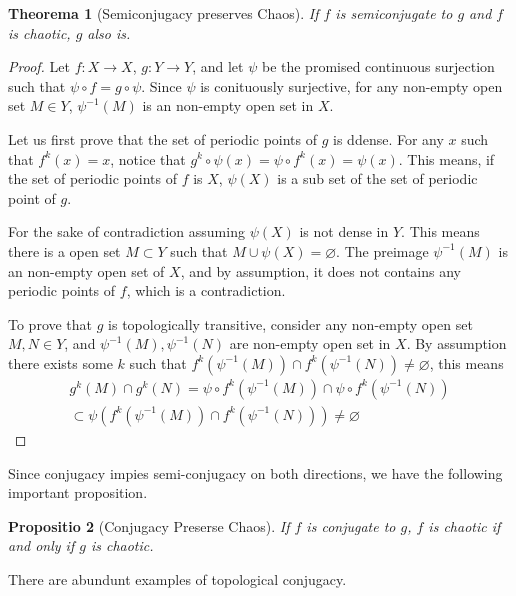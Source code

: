\documentclass{report}
\newtheorem{thm}{Theorema}[chapter]
\newtheorem{prop}[thm]{Propositio}
\theoremstyle{definition}
\theoremstyle{definition}
\theoremstyle{remark}
\renewcommand\emptyset{\varnothing}
\begin{document}
\begin{thm}[Semiconjugacy preserves Chaos]\label{th_semicong_chaos}
	If $f$ is semiconjugate to $g$ and $f$ is chaotic, $g$ also is.
\end{thm}

\begin{proof}
	Let $f: X \rightarrow X$, $g:  Y \rightarrow Y$, and let $\psi$ be the promised continuous surjection such that
	$\psi \circ f = g \circ \psi$. 
	Since $\psi$ is conituously surjective, for any non-empty open set $M \in Y$, $\psi^{-1}(M)$ is an non-empty open set in $X$.

	Let us first prove that the set of periodic points of $g$ is ddense.
	For any $x$ such that $f^k(x) = x$, notice that $g^k \circ \psi (x) = \psi \circ f^k (x) = \psi(x)$. 
	This means, if the set of periodic points of $f$ is $X$, $\psi(X)$ is a sub set of the set of periodic point of $g$.

	For the sake of contradiction assuming $\psi(X)$ is not dense in $Y$. 
	This means there is a open set $M \subset Y$ such that $M \cup \psi(X) = \emptyset$.
	The preimage $\psi^{-1}(M)$ is an non-empty open set of $X$, and by assumption, it does not contains any periodic points of $f$, which is a contradiction.

	To prove that $g$ is topologically transitive, consider any non-empty open set $M, N \in Y$, and $\psi^{-1}(M), \psi^{-1}(N)$ are non-empty open set in $X$. 
	By assumption there exists some $k$ such that $f^k(\psi^{-1}(M)) \cap f^k(\psi^{-1}(N)) \neq \emptyset$, this means 
	\begin{align*}
		g^k(M) \cap g^k(N) = \psi \circ f^k(\psi^{-1}(M)) \cap \psi \circ f^k(\psi^{-1}(N)) \\
		\subset \psi( f^k(\psi^{-1}(M)) \cap  f^k(\psi^{-1}(N))) \neq \emptyset
	\end{align*}
\end{proof}

Since conjugacy impies semi-conjugacy on both directions, we have the following important proposition.

\begin{prop}[Conjugacy Preserse Chaos]\label{prop_conj_chaos}
	If $f$ is conjugate to $g$, $f$ is chaotic if and only if $g$ is chaotic.
\end{prop}

There are abundunt examples of topological conjugacy.
\end{document}
